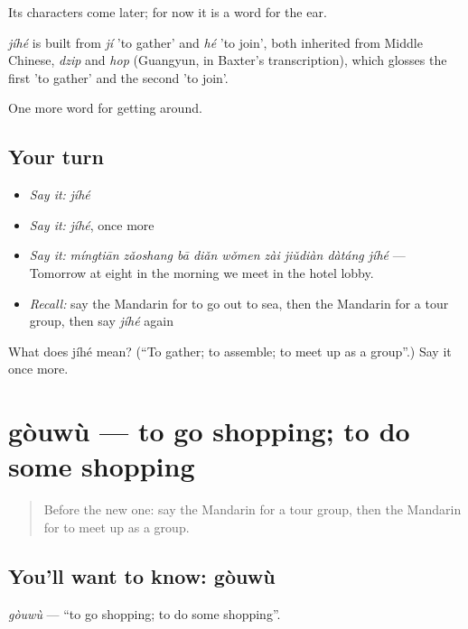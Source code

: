 Its characters come later; for now it is a word for the ear.

\begin{cousinweb}
\emph{jíhé} is built from \emph{jí} 'to gather' and \emph{hé} 'to join', both inherited from Middle Chinese, \emph{dzip} and \emph{hop} (Guangyun, in Baxter's transcription), which glosses the first 'to gather' and the second 'to join'.
\end{cousinweb}

\begin{grammarlens}[title={What you've built}]
One more word for getting around.
\end{grammarlens}

\subsection*{Your turn}
\begin{itemize}
\raggedright
  \item \emph{Say it:} \emph{jíhé}
  \item \emph{Say it:} \emph{jíhé}, once more
  \item \emph{Say it:} \emph{míngtiān zǎoshang bā diǎn wǒmen zài jiǔdiàn dàtáng jíhé} — Tomorrow at eight in the morning we meet in the hotel lobby.
  \item \emph{Recall:} say the Mandarin for to go out to sea, then the Mandarin for a tour group, then say \emph{jíhé} again
\end{itemize}

\begin{tcolorbox}[breakable,colback=teal!4,colframe=teal!35!black,title={Before you move on}]
What does jíhé mean? (\textquotedblleft{}To gather; to assemble; to meet up as a group\textquotedblright{}.) Say it once more.
\end{tcolorbox}
\section[gòuwù]{gòuwù — to go shopping; to do some shopping}

\label{lesson:ZH-C434-gouwu}



\begin{quote}
Before the new one: say the Mandarin for a tour group, then the Mandarin for to meet up as a group.
\end{quote}

\subsection*{You'll want to know: gòuwù}
\emph{gòuwù} — \textquotedblleft{}to go shopping; to do some shopping\textquotedblright{}.


